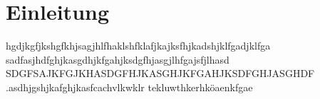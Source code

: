 \chapter{Einleitung}
hgdjkgfjkshgfkhjsagjhlfhaklshfklafjkajksfhjkadshjklfgadjklfga
sadfasjhdfghjkasgdhjkfgahjksdgfhjasgjlhfgajsfjlhasd
SDGFSAJKFGJKHASDGFHJKASGHJKFGAHJKSDFGHJASGHDF
.asdhjgshjkafghjkasfcachvlkwklr tekluwthkerhköaenkfgae